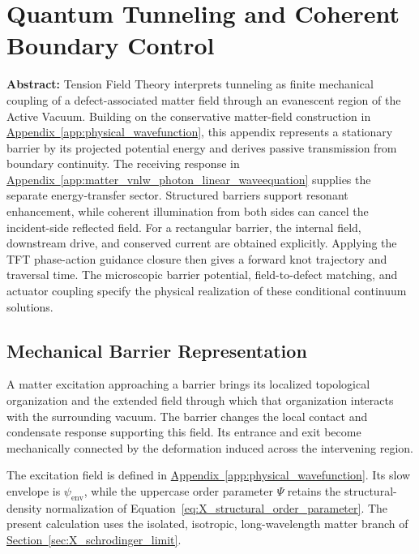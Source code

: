 \chapter{Quantum Tunneling and Coherent Boundary Control}
\label{app:quantum_tunneling}

\noindent\textbf{Abstract:}
Tension Field Theory interprets tunneling as finite mechanical coupling of a defect-associated matter field through an evanescent region of the Active Vacuum. Building on the conservative matter-field construction in \hyperref[app:physical_wavefunction]{Appendix~\ref*{app:physical_wavefunction}}, this appendix represents a stationary barrier by its projected potential energy and derives passive transmission from boundary continuity. The receiving response in \hyperref[app:matter_vnlw_photon_linear_waveequation]{Appendix~\ref*{app:matter_vnlw_photon_linear_waveequation}} supplies the separate energy-transfer sector. Structured barriers support resonant enhancement, while coherent illumination from both sides can cancel the incident-side reflected field. For a rectangular barrier, the internal field, downstream drive, and conserved current are obtained explicitly. Applying the TFT phase-action guidance closure then gives a forward knot trajectory and traversal time. The microscopic barrier potential, field-to-defect matching, and actuator coupling specify the physical realization of these conditional continuum solutions.

\section{Mechanical Barrier Representation}
\label{sec:tunneling_mechanical_barrier}

A matter excitation approaching a barrier brings its localized topological organization and the extended field through which that organization interacts with the surrounding vacuum. The barrier changes the local contact and condensate response supporting this field. Its entrance and exit become mechanically connected by the deformation induced across the intervening region.

The excitation field is defined in \hyperref[app:physical_wavefunction]{Appendix~\ref*{app:physical_wavefunction}}. Its slow envelope is $\psi_{\mathrm{env}}$, while the uppercase order parameter $\Psi$ retains the structural-density normalization of Equation~\eqref{eq:X_structural_order_parameter}. The present calculation uses the isolated, isotropic, long-wavelength matter branch of \hyperref[sec:X_schrodinger_limit]{Section~\ref*{sec:X_schrodinger_limit}}.

